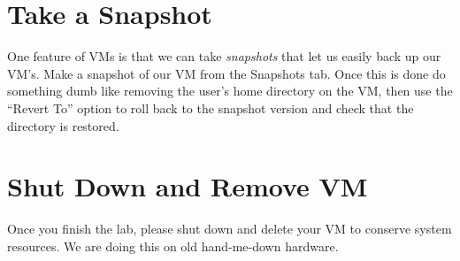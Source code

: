 \documentclass{article}
\begin{document}
\section{Take a Snapshot}
One feature of VMs is that we can take \emph{snapshots} that let us easily back up our VM's. Make a snapshot of our VM from the Snapshots tab. Once this is done do something dumb like removing the user's home directory on the VM, then use the ``Revert To'' option to roll back to the snapshot version and check that the directory is restored.

\section{Shut Down and Remove VM}
Once you finish the lab, please shut down and delete your VM to conserve system resources. We are doing this on old
hand-me-down hardware.
\end{document}
